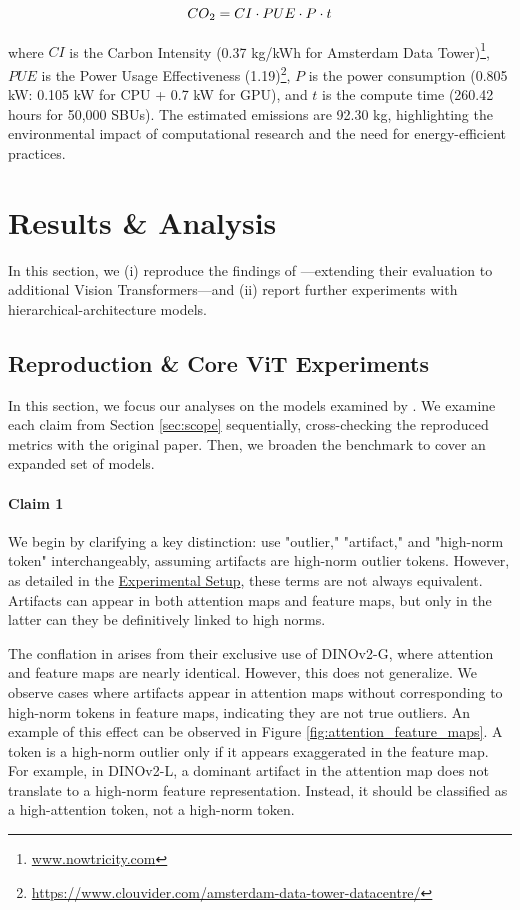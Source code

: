 \documentclass[10pt]{article} %
\begin{document}
\begin{equation}
CO\textsubscript{2} = CI \cdot PUE \cdot P \cdot t
\end{equation}

where \( CI \) is the Carbon Intensity (0.37 kg/kWh for Amsterdam Data Tower)\footnote{\url{www.nowtricity.com}}, \( PUE \) is the Power Usage Effectiveness (1.19)\footnote{\url{https://www.clouvider.com/amsterdam-data-tower-datacentre/}}, \( P \) is the power consumption (0.805 kW: 0.105 kW for CPU + 0.7 kW for GPU), and \( t \) is the compute time (260.42 hours for 50,000 SBUs). The estimated emissions are 92.30 kg, highlighting the environmental impact of computational research and the need for energy-efficient practices.

\section{Results \& Analysis}
\label{sec:results}
In this section, we (i) reproduce the findings of \citet{darcet2024registers}—extending their evaluation to additional Vision Transformers—and (ii) report further experiments with hierarchical-architecture models.

\subsection{Reproduction \& Core ViT Experiments}
\label{subsec:results1}

In this section, we focus our analyses on the models examined by \citet{darcet2024registers}. We examine each claim from Section \ref{sec:scope} sequentially, cross-checking the reproduced metrics with the original paper. Then, we broaden the benchmark to cover an expanded set of models.

\paragraph{Claim 1}

We begin by clarifying a key distinction: \citet{darcet2024registers} use "outlier," "artifact," and "high-norm token" interchangeably, assuming artifacts are high-norm outlier tokens. However, as detailed in the \hyperref[sec:experimental_setup]{Experimental Setup}, these terms are not always equivalent. Artifacts can appear in both attention maps and feature maps, but only in the latter can they be definitively linked to high norms. 

The conflation in \citet{darcet2024registers} arises from their exclusive use of DINOv2-G, where attention and feature maps are nearly identical. However, this does not generalize. We observe cases where artifacts appear in attention maps without corresponding to high-norm tokens in feature maps, indicating they are not true outliers. An example of this effect can be observed in Figure \ref{fig:attention_feature_maps}. A token is a high-norm outlier only if it appears exaggerated in the feature map. For example, in DINOv2-L, a dominant artifact in the attention map does not translate to a high-norm feature representation. Instead, it should be classified as a high-attention token, not a high-norm token.
\end{document}
